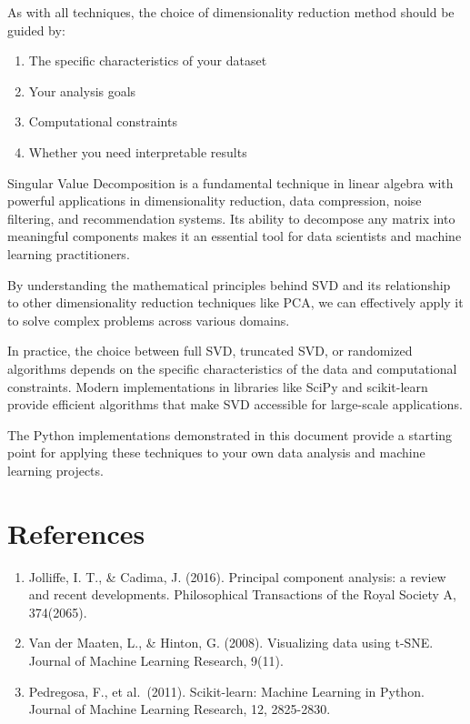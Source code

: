\documentclass[
  letterpaper,
  DIV=11,
  numbers=noendperiod]{scrreprt}
\providecommand{\tightlist}{%
  \setlength{\itemsep}{0pt}\setlength{\parskip}{0pt}}\usepackage{longtable,booktabs,array}
\begin{document}
As with all techniques, the choice of dimensionality reduction method
should be guided by:

\begin{enumerate}
\def\labelenumi{\arabic{enumi}.}
\tightlist
\item
  The specific characteristics of your dataset
\item
  Your analysis goals
\item
  Computational constraints
\item
  Whether you need interpretable results
\end{enumerate}

Singular Value Decomposition is a fundamental technique in linear
algebra with powerful applications in dimensionality reduction, data
compression, noise filtering, and recommendation systems. Its ability to
decompose any matrix into meaningful components makes it an essential
tool for data scientists and machine learning practitioners.

By understanding the mathematical principles behind SVD and its
relationship to other dimensionality reduction techniques like PCA, we
can effectively apply it to solve complex problems across various
domains.

In practice, the choice between full SVD, truncated SVD, or randomized
algorithms depends on the specific characteristics of the data and
computational constraints. Modern implementations in libraries like
SciPy and scikit-learn provide efficient algorithms that make SVD
accessible for large-scale applications.

The Python implementations demonstrated in this document provide a
starting point for applying these techniques to your own data analysis
and machine learning projects.

\section{References}\label{references}

\begin{enumerate}
\def\labelenumi{\arabic{enumi}.}
\tightlist
\item
  Jolliffe, I. T., \& Cadima, J. (2016). Principal component analysis: a
  review and recent developments. Philosophical Transactions of the
  Royal Society A, 374(2065).
\item
  Van der Maaten, L., \& Hinton, G. (2008). Visualizing data using
  t-SNE. Journal of Machine Learning Research, 9(11).
\item
  Pedregosa, F., et al.~(2011). Scikit-learn: Machine Learning in
  Python. Journal of Machine Learning Research, 12, 2825-2830.
\end{enumerate}
\end{document}
